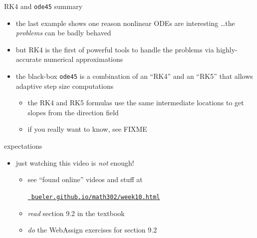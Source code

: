\documentclass[urlcolor=blue,dvipsnames]{beamer}
\begin{document}
\begin{frame}{RK4 and \texttt{ode45} summary}

\begin{itemize}
\item the last example shows one reason nonlinear ODEs are interesting \dots the \emph{problems} can be badly behaved
\item but RK4 is the first of powerful tools to handle the problems via highly-accurate numerical approximations
\item the black-box \texttt{ode45} is a combination of an ``RK4'' and an ``RK5'' that allows adaptive step size computations
   \begin{itemize}
   \item the RK4 and RK5 formulas use the same intermediate locations to get slopes from the direction field
   \item if you really want to know, see FIXME
   \end{itemize}
\end{itemize}
\end{frame}


\begin{frame}{expectations}

\begin{itemize}
\item just watching this video is \emph{not} enough!
     \begin{itemize}
     \item see ``found online'' videos and stuff at

     \centerline{\href{https://bueler.github.io/math302/week10.html}{\tt \color{cyan} bueler.github.io/math302/week10.html}}
     \item \emph{read} section 9.2 in the textbook
     \item \emph{do} the WebAssign exercises for section 9.2
     \end{itemize}
\end{itemize}
\end{frame}
\end{document}
